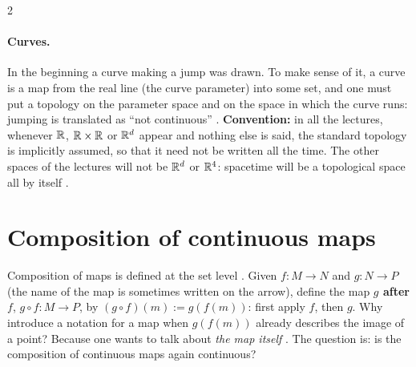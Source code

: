 \begin{paracol}{2}
\paragraph{Curves.} In the beginning a curve making a jump was drawn. To make sense of it, a curve is a map from the real line (the curve parameter) into some set,
and one must put a topology on the parameter space and on the space in which the curve runs: jumping is translated as ``not continuous''
. \textbf{Convention:} in all the lectures, whenever $\mathbb{R}$, $\mathbb{R}\times\mathbb{R}$ or $\mathbb{R}^d$ appear and nothing else is said,
the standard topology is implicitly assumed, so that it need not be written all the time. The other spaces of the lectures will not be $\mathbb{R}^d$ or $\mathbb{R}^4$:
spacetime will be a topological space all by itself .

\section{Composition of continuous maps}\label{sec:c01-composition}

Composition of maps is defined at the set level . Given $f\colon M\to N$ and $g\colon N\to P$ (the name of the map is sometimes written on the
arrow), define the map \textbf{$g$ after $f$}, $g\circ f\colon M\to P$, by $(g\circ f)(m):=g(f(m))$: first apply $f$, then $g$. Why introduce a notation for a
map when $g(f(m))$ already describes the image of a point? Because one wants to talk about \emph{the map itself}
. The question is: is the composition of continuous maps again continuous?


\end{paracol}
